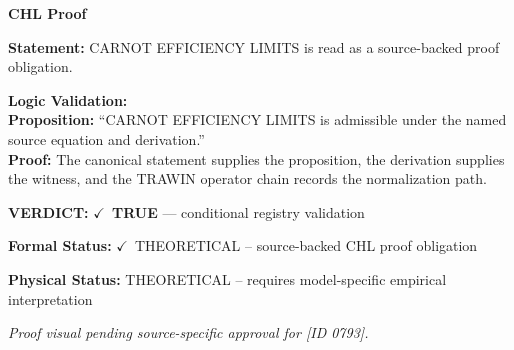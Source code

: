 \vspace{0.45em}
\noindent\textbf{CHL Proof}\par
\textbf{Statement:} CARNOT EFFICIENCY LIMITS is read as a source-backed proof obligation.

\textbf{Logic Validation:}\\
\textbf{Proposition:} ``CARNOT EFFICIENCY LIMITS is admissible under the named source equation and derivation.''\\
\textbf{Proof:} The canonical statement supplies the proposition, the derivation supplies the witness, and the TRAWIN operator chain records the normalization path.

\textbf{VERDICT:} \ensuremath{\checkmark}\ \textbf{TRUE} --- conditional registry validation

\textbf{Formal Status:} \ensuremath{\checkmark}\ THEORETICAL -- source-backed CHL proof obligation

\textbf{Physical Status:} THEORETICAL -- requires model-specific empirical interpretation
\par\vspace{0.45em}
\par
\vfill
\begingroup\footnotesize\itshape
Proof visual pending source-specific approval for [ID 0793].
\par\endgroup
\vfill
\endgroup
\endgroup
